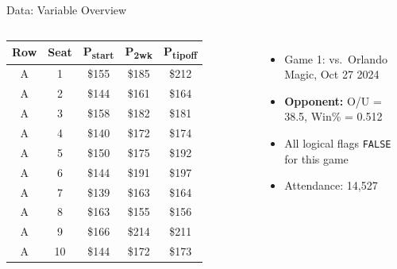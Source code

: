\documentclass{beamer}
\begin{document}
\begin{frame}{Data: Variable Overview}
\begin{columns}[T]
\vspace{0.2em}
\begin{tabular}{ccccc}
\toprule
\textbf{Row} & \textbf{Seat} & \textbf{P\textsubscript{start}} & \textbf{P\textsubscript{2wk}} & \textbf{P\textsubscript{tipoff}} \\
\midrule
A & 1  & \$155 & \$185 & \$212 \\
A & 2  & \$144 & \$161 & \$164 \\
A & 3  & \$158 & \$182 & \$181 \\
A & 4  & \$140 & \$172 & \$174 \\
A & 5  & \$150 & \$175 & \$192 \\
A & 6  & \$144 & \$191 & \$197 \\
A & 7  & \$139 & \$163 & \$164 \\
A & 8  & \$163 & \$155 & \$156 \\
A & 9  & \$166 & \$214 & \$211 \\
A & 10 & \$144 & \$172 & \$173 \\
\bottomrule
\end{tabular}

\vspace{0.4em}
\begin{itemize}
  \setlength\itemsep{0.15em}
  \item Game 1: vs.\ Orlando Magic, Oct 27 2024
  \item \textbf{Opponent:} O/U = 38.5, Win\% = 0.512
  \item All logical flags \texttt{FALSE} for this game
  \item Attendance: 14,527
\end{itemize}

\end{columns}

\end{frame}
\end{document}
